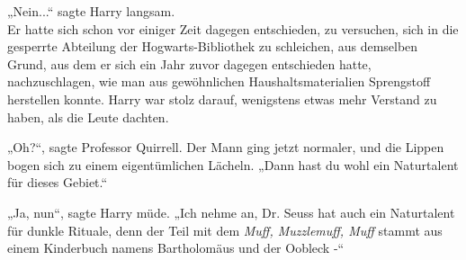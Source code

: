 {„Nein...“ sagte Harry langsam.\\ Er hatte sich schon vor einiger Zeit dagegen entschieden, zu versuchen, sich in die gesperrte Abteilung der Hogwarts-Bibliothek zu schleichen, aus demselben Grund, aus dem er sich ein Jahr zuvor dagegen entschieden hatte, nachzuschlagen, wie man aus gewöhnlichen Haushaltsmaterialien Sprengstoff herstellen konnte. Harry war stolz darauf, wenigstens etwas mehr Verstand zu haben, als die Leute dachten.

„Oh?“, sagte Professor Quirrell. Der Mann ging jetzt normaler, und die Lippen bogen sich zu einem eigentümlichen Lächeln. „Dann hast du wohl ein Naturtalent für dieses Gebiet.“

„Ja, nun“, sagte Harry müde. „Ich nehme an, Dr. Seuss hat auch ein Naturtalent für dunkle Rituale, denn der Teil mit dem \emph{Muff, Muzzlemuff, Muff} stammt aus einem Kinderbuch namens Bartholomäus und der Oobleck -“

}
